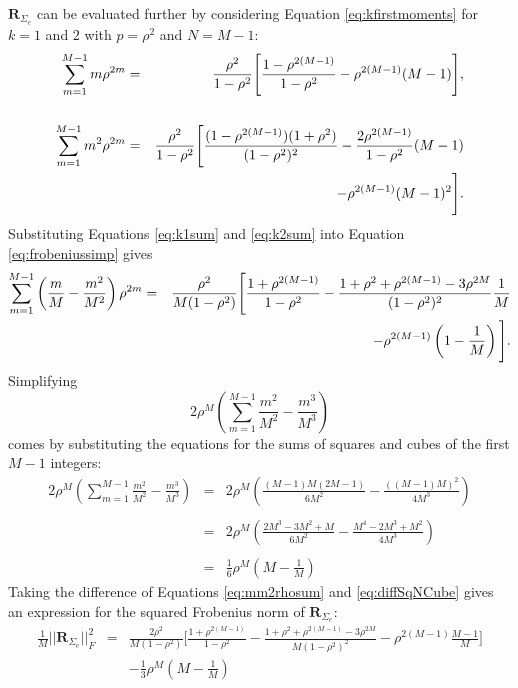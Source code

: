 \documentclass[letterpaper,12pt,oneside,final]{article}
\newcommand{\m}[1]{\mathbf{#1}}               %
\newcommand{\norm}[1]{||{#1}||}              %
\newcommand{\frob}[1]{\norm{#1}_F}
\begin{document}
$\m{R}_{\Sigma_e}$ can be evaluated further by considering Equation \ref{eq:kfirstmoments} for $k = 1$ and $2$ with $p = \rho^2$ and $N = M-1$:
\begin{eqnarray}
  \sum_{m = 1}^{M-1} m \rho^{2m} & = & \frac{\rho^2}{1 - \rho^2} \Bigg [ \frac{1 - \rho^{2(M-1)}}{1 - \rho^2} - \rho^{2(M-1)} (M - 1) \Bigg ], \label{eq:k1sum} \\
  & & \nonumber \\
  \sum_{m = 1}^{M-1} m^2 \rho^{2m} & = & \frac{\rho^2}{1 - \rho^2} \Bigg [ \frac{(1 - \rho^{2(M-1)})(1 + \rho^2)}{(1 - \rho^2)^2} - \frac{2 \rho^{2(M-1)}}{1 - \rho^2}(M - 1) \nonumber \\
  & & \hspace{1.8cm} - \rho^{2(M-1)} (M-1)^2 \Bigg ]. \label{eq:k2sum}
\end{eqnarray}
Substituting Equations \ref{eq:k1sum} and \ref{eq:k2sum} into Equation \ref{eq:frobeniussimp} gives
\begin{eqnarray}
  \sum_{m = 1}^{M-1} \left ( \frac{m}{M} - \frac{m^2}{M^2} \right ) \rho^{2m} & = & \frac{\rho^2}{M(1 - \rho^2)} \Bigg [ \frac{1 + \rho^{2(M-1)}}{1 - \rho^2} - \frac{1 + \rho^2 + \rho^{2(M-1)} - 3\rho^{2M}}{(1 - \rho^2)^2}\frac{1}{M} \nonumber \\
  & & \hspace{2.2cm} - \rho^{2(M-1)} \left ( 1 - \frac{1}{M} \right )\Bigg ]. \label{eq:mm2rhosum}
\end{eqnarray}
Simplifying
$$2 \rho^M \left ( \sum_{m = 1}^{M-1} \frac{m^2}{M^2} - \frac{m^3}{M^3} \right )$$
comes by substituting the equations for the sums of squares and cubes of the first $M-1$ integers:
\begin{eqnarray}
  2 \rho^M \left ( \sum_{m = 1}^{M-1} \frac{m^2}{M^2} - \frac{m^3}{M^3} \right ) & = & 2 \rho^M \left ( \frac{(M-1)M(2M-1)}{6M^2} - \frac{((M-1)M)^2}{4M^3} \right ) \nonumber \\
  & & \nonumber \\
  & = & 2 \rho^M  \left ( \frac{2M^3 - 3M^2 + M}{6M^2} - \frac{M^4 - 2M^3 + M^2}{4M^3} \right ) \nonumber \\
  & & \nonumber \\
  & = & \frac{1}{6} \rho^M  \left ( M - \frac{1}{M} \right ) \label{eq:diffSqNCube}
\end{eqnarray}
Taking the difference of Equations \ref{eq:mm2rhosum} and \ref{eq:diffSqNCube} gives an expression for the squared Frobenius norm of $\m{R}_{\Sigma_e}$:
\begin{eqnarray}
  \frac{1}{M} \frob{\m{R}_{\Sigma_e}}^2 & = &  \frac{2\rho^2}{M(1 - \rho^2)} \Bigg [ \frac{1 + \rho^{2(M-1)}}{1 - \rho^2} - \frac{1 + \rho^2 + \rho^{2(M-1)} - 3\rho^{2M}}{M(1 - \rho^2)^2} - \rho^{2(M-1)}  \frac{M - 1}{M}\Bigg ] \nonumber \\
  & & - \frac{1}{3} \rho^M \left ( M - \frac{1}{M} \right ) \label{eq:frobNormSigE}
\end{eqnarray}
\end{document}
